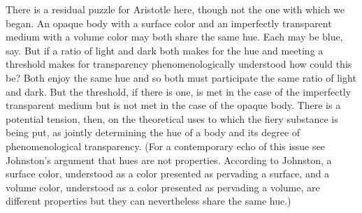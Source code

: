 There is a residual puzzle for Aristotle here, though not the one with which we began. An opaque body with a surface color and an imperfectly transparent medium with a volume color may both share the same hue. Each may be blue, say. But if a ratio of light and dark both makes for the hue and meeting a threshold makes for transparency phenomenologically understood how could this be? Both enjoy the same hue and so both must participate the same ratio of light and dark. But the threshold, if there is one, is met in the case of the imperfectly transparent medium but is not met in the case of the opaque body. There is a potential tension, then, on the theoretical uses to which the fiery substance is being put, as jointly determining the hue of a body and its degree of phenomenological transparency. (For a contemporary echo of this issue see Johnston's \citeyear[263]{Johnston:2007qy} argument that hues are not properties. According to Johnston, a surface color, understood as a color presented as pervading a surface, and a volume color, understood as a color presented as pervading a volume, are different properties but they can nevertheless share the same hue.)


